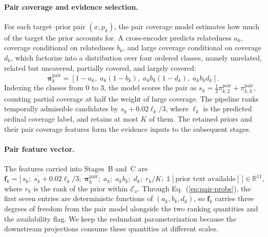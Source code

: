 \paragraph{Pair coverage and evidence selection.}
For each target--prior pair $(x,p_k)$, the pair coverage model estimates how
much of the target the prior accounts for. A cross-encoder predicts
relatedness $a_k$, coverage conditional on relatedness $b_k$, and large
coverage conditional on coverage $d_k$, which factorize into a distribution
over four ordered classes, namely unrelated, related but uncovered, partially
covered, and largely covered:
\begin{equation}
 \boldsymbol{\pi}^{\mathrm{pair}}_k
 = [1-a_k,\;a_k(1-b_k),\;a_kb_k(1-d_k),\;a_kb_kd_k].
 \label{eq:pair-probs}
\end{equation}
Indexing the classes from $0$ to $3$, the model scores the pair as
$s_k=\tfrac12\pi^{\mathrm{pair}}_{k,2}+\pi^{\mathrm{pair}}_{k,3}$, counting
partial coverage at half the weight of large coverage. The pipeline ranks
temporally admissible candidates by $s_k+0.02\ell_k/3$, where $\ell_k$ is the
predicted ordinal coverage label, and retains at most $K$ of them. The
retained priors and their pair coverage features form the evidence inputs to
the subsequent stages.

\paragraph{Pair feature vector.}
The features carried into Stages~B and~C are
\begin{equation}
 \boldsymbol{f}_k=\bigl[\,s_k;\;s_k+0.02\ell_k/3;\;
 \boldsymbol{\pi}^{\mathrm{pair}}_k;\;a_k;\;a_kb_k;\;d_k;\;
 r_k/K;\;\mathbb{1}[\text{prior text available}]\,\bigr]
 \in\mathbb{R}^{11},
\end{equation}
where $r_k$ is the rank of the prior within $\mathcal{E}_x$. Through
Eq.~(\ref{eq:pair-probs}), the first seven entries are deterministic functions
of $(a_k,b_k,d_k)$, so $\boldsymbol{f}_k$ carries three degrees of freedom
from the pair model alongside the two ranking quantities and the availability
flag. We keep the redundant parameterization because the downstream
projections consume these quantities at different scales.

